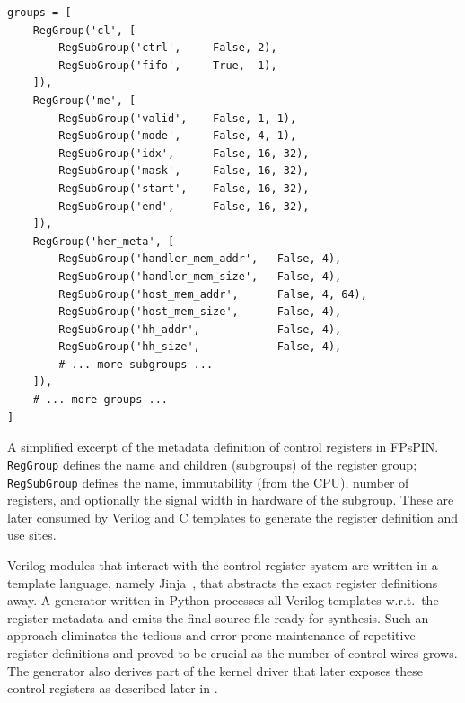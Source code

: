 \begin{listing}[tp]
\begin{verbatim}
groups = [
    RegGroup('cl', [
        RegSubGroup('ctrl',     False, 2),
        RegSubGroup('fifo',     True,  1),
    ]),
    RegGroup('me', [
        RegSubGroup('valid',    False, 1, 1),
        RegSubGroup('mode',     False, 4, 1),
        RegSubGroup('idx',      False, 16, 32),
        RegSubGroup('mask',     False, 16, 32),
        RegSubGroup('start',    False, 16, 32),
        RegSubGroup('end',      False, 16, 32),
    ]),
    RegGroup('her_meta', [
        RegSubGroup('handler_mem_addr',   False, 4),
        RegSubGroup('handler_mem_size',   False, 4),
        RegSubGroup('host_mem_addr',      False, 4, 64),
        RegSubGroup('host_mem_size',      False, 4),
        RegSubGroup('hh_addr',            False, 4),
        RegSubGroup('hh_size',            False, 4),
        # ... more subgroups ...
    ]),
    # ... more groups ...
]
\end{verbatim}
\caption{A simplified excerpt of the metadata definition of control registers in FPsPIN.  \texttt{RegGroup} defines the name and children (subgroups) of the register group; \texttt{RegSubGroup} defines the name, immutability (from the CPU), number of registers, and optionally the signal width in hardware of the subgroup.  These are later consumed by Verilog and C templates to generate the register definition and use sites.} \label{lst:reg-meta}
\end{listing}

Verilog modules that interact with the control register system are written in a template language, namely Jinja~\cite{noauthor_jinja_nodate}, that abstracts the exact register definitions away.  A generator written in Python processes all Verilog templates w.r.t.\ the register metadata and emits the final source file ready for synthesis.  Such an approach eliminates the tedious and error-prone maintenance of repetitive register definitions and proved to be crucial as the number of control wires grows.  The generator also derives part of the kernel driver that later exposes these control registers as described later in .


